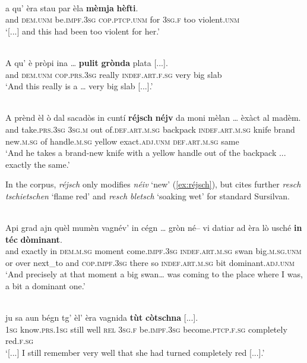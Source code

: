 \ea
\label{}
\\
\gll [...] a qu’ èra stau par èla \textbf{mèmja} \textbf{hèfti}.\\
{} and \textsc{dem.unm} be.\textsc{impf.3sg} \textsc{cop.ptcp.unm} for \textsc{3sg.f} too violent.\textsc{unm} \\
\glt `[...] and this had been too violent for her.'
\z

\ea
\label{}
\\
\gll    A qu’ è pròpi ina … \textbf{pulit} \textbf{grònda} plata [...].\\
and \textsc{dem.unm} \textsc{cop.prs.3sg} really \textsc{indef.art.f.sg} {} very big slab\\
\glt `And this really is a … very big slab [...].'
\z

\ea
\label{ex:réjsch}
\\
\gll A prènd èl ò dal sacadòs in cuntí \textbf{réjsch} \textbf{néjv} da moni mèlan … èxàct al madèm.\\
and take.\textsc{prs.3sg} \textsc{3sg.m} out of.\textsc{def.art.m.sg} backpack \textsc{indef.art.m.sg} knife brand new.\textsc{m.sg} of handle.\textsc{m.sg} yellow {} exact.\textsc{adj.unm} \textsc{def.art.m.sg} same\\
\glt `And he takes a brand-new knife with a yellow handle out of the backpack ... exactly the same.'
\z

In the corpus, \textit{réjsch} only modifies \textit{néiv} `new' (\ref{ex:réjsch}), but \citet[931]{Decurtins2012} cites further \textit{resch tschietschen} `flame red' and \textit{resch bletsch} `soaking wet' for standard Sursilvan.

\ea
\label{}
\\
\gll Api grad ajn quèl mumèn vagnév’ in cégn … gròn né– vi datiar ad èra lò usché \textbf{in} \textbf{téc} \textbf{dòminant}.\\
and exactly in \textsc{dem.m.sg} moment come.\textsc{impf.3sg} \textsc{indef.art.m.sg} swan {} big.\textsc{m.sg.unm} or over next\_to and \textsc{cop.impf.3sg} there so \textsc{indef.art.m.sg} bit dominant.\textsc{adj.unm}\\
\glt `And precisely at that moment a big swan… was coming to the place where I was, a bit a dominant one.'
\z

\ea\label{}
\\
\gll    [...] ju sa aun bégn tg’ èl’ èra vagnida \textbf{tùt} \textbf{còtschna} [...].\\
{} \textsc{1sg} know.\textsc{prs.1sg} still well \textsc{rel} \textsc{3sg.f} be.\textsc{impf.3sg} become.\textsc{ptcp.f.sg} completely red.\textsc{f.sg} \\
\glt `[...] I still remember very well that she had turned completely red [...].'
\z

